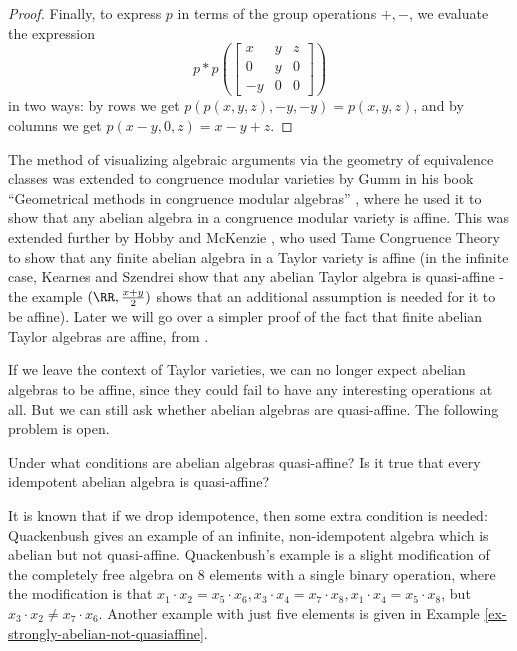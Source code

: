 \begin{proof}
Finally, to express $p$ in terms of the group operations $+,-$, we evaluate the expression
\[
p*p\left(\begin{bmatrix} x & y & z\\ 0 & y & 0\\ -y & 0 & 0\end{bmatrix}\right)
\]
in two ways: by rows we get $p(p(x,y,z),-y,-y) = p(x,y,z)$, and by columns we get $p(x-y,0,z) = x-y+z$.
\end{proof}

The method of visualizing algebraic arguments via the geometry of equivalence classes was extended to congruence modular varieties by Gumm in his book ``Geometrical methods in congruence modular algebras'' \cite{gumm-geometric}, where he used it to show that any abelian algebra in a congruence modular variety is affine. This was extended further by Hobby and McKenzie \cite{hobby-mckenzie}, who used Tame Congruence Theory to show that any finite abelian algebra in a Taylor variety is affine (in the infinite case, Kearnes and Szendrei \cite{kearnes-taylor-affine} show that any abelian Taylor algebra is quasi-affine - the example $(\RR, \frac{x+y}{2})$ shows that an additional assumption is needed for it to be affine). Later we will go over a simpler proof of the fact that finite abelian Taylor algebras are affine, from \cite{pointing-no-absorption}.

\begin{rem} If we leave the context of Taylor varieties, we can no longer expect abelian algebras to be affine, since they could fail to have any interesting operations at all. But we can still ask whether abelian algebras are quasi-affine. The following problem is open.
\end{rem}

\begin{prob} Under what conditions are abelian algebras quasi-affine? Is it true that every idempotent abelian algebra is quasi-affine?
\end{prob}

It is known that if we drop idempotence, then some extra condition is needed: Quackenbush \cite{quasi-affine-quackenbush} gives an example of an infinite, non-idempotent algebra which is abelian but not quasi-affine. Quackenbush's example is a slight modification of the completely free algebra on $8$ elements with a single binary operation, where the modification is that $x_1 \cdot x_2 = x_5 \cdot x_6, x_3 \cdot x_4 = x_7 \cdot x_8, x_1\cdot x_4 = x_5 \cdot x_8$, but $x_3 \cdot x_2 \ne x_7 \cdot x_6$. Another example with just five elements is given in Example \ref{ex-strongly-abelian-not-quasiaffine}.

